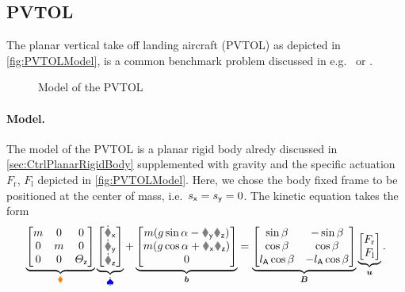 \subsection{PVTOL}
The planar vertical take off landing aircraft (PVTOL) as depicted in \autoref{fig:PVTOLModel}, is a common benchmark problem discussed in e.g.\ \cite{Hauser:PVTOL} or \cite{Fliess:LieBacklund}.
\begin{figure}
 \centering
 
 \caption{Model of the PVTOL}
 \label{fig:PVTOLModel}
\end{figure}

\paragraph{Model.}
The model of the PVTOL is a planar rigid body alredy discussed in \autoref{sec:CtrlPlanarRigidBody} supplemented with gravity and the specific actuation $F_\text{r}$, $F_\text{l}$ depicted in \autoref{fig:PVTOLModel}.
Here, we chose the body fixed frame to be positioned at the center of mass, i.e.\ $s_{\mathsf{x}} = s_{\mathsf{y}} = 0$.
The kinetic equation takes the form
\begin{align}
 \underbrace{\begin{bmatrix} \m & 0 & 0 \\ 0 & \m & 0 \\ 0 & 0 & \Jz \end{bmatrix}}_{\sysInertiaMat}
 \underbrace{\begin{bmatrix} \vxd \\ \vyd \\ \wzd \end{bmatrix}}_{\sysVeld}
 +
 \underbrace{\begin{bmatrix} m(\gravityAccConst \sin\tiltAngle - \vy \wz) \\ m (\gravityAccConst \cos\tiltAngle + \vx \wz) \\ 0 \end{bmatrix}}_{\sysForce}
 =
 \underbrace{\begin{bmatrix} \sin\beta & -\sin\beta \\ \cos\beta & \cos\beta \\ \ArmRadius \cos\beta & -\ArmRadius\cos\beta \end{bmatrix}}_{\sysInputMat}
 \underbrace{\begin{bmatrix} F_\text{r} \\ F_\text{l} \end{bmatrix}}_{\sysInput}
 .
\end{align}
